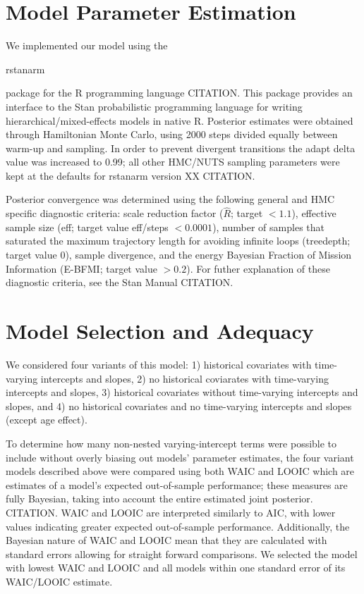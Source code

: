 \documentclass[12pt,letterpaper]{article}
\begin{document}
\section{Model Parameter Estimation}

We implemented our model using the \begin{texttt}rstanarm\end{texttt} package for the R programming language CITATION. This package provides an interface to the Stan probabilistic programming language for writing hierarchical/mixed-effects models in native R. Posterior estimates were obtained through Hamiltonian Monte Carlo, using 2000 steps divided equally between warm-up and sampling. In order to prevent divergent transitions the adapt delta value was increased to 0.99; all other HMC/NUTS sampling parameters were kept at the defaults for rstanarm version XX CITATION. 

Posterior convergence was determined using the following general and HMC specific diagnostic criteria: scale reduction factor (\(\hat{R}\); target \(<1.1\)), effective sample size (eff; target value eff/steps \(<0.0001\)), number of samples that saturated the maximum trajectory length for avoiding infinite loops (treedepth; target value 0), sample divergence, and the energy Bayesian Fraction of Mission Information (E-BFMI; target value \(>0.2\)). For futher explanation of these diagnostic criteria, see the Stan Manual CITATION.


\section{Model Selection and Adequacy}

We considered four variants of this model: 1) historical covariates with time-varying intercepts and slopes, 2) no historical coviarates with time-varying intercepts and slopes, 3) historical covariates without time-varying intercepts and slopes, and 4) no historical covariates and no time-varying intercepts and slopes (except age effect).

To determine how many non-nested varying-intercept terms were possible to include without overly biasing out models' parameter estimates, the four variant models described above were compared using both WAIC and LOOIC which are estimates of a model's expected out-of-sample performance; these measures are fully Bayesian, taking into account the entire estimated joint posterior. CITATION. WAIC and LOOIC are interpreted similarly to AIC, with lower values indicating greater expected out-of-sample performance. Additionally, the Bayesian nature of WAIC and LOOIC mean that they are calculated with standard errors allowing for straight forward comparisons. We selected the model with lowest WAIC and LOOIC and all models within one standard error of its WAIC/LOOIC estimate.
\end{document}
